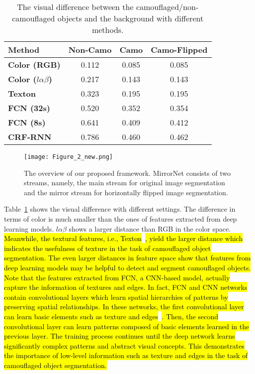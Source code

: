 \documentclass[journal]{IEEEtran}
\DeclareRobustCommand{\hlcyan}[1]{{\sethlcolor{white}\hl{#1}}}
\begin{document}
\begin{table}[!t]
	\small	
	\centering
	\begin{tabular}{|l|c|c|c|}
		\hline
		\textbf{Method} & \textbf{Non-Camo} & \textbf{Camo} & \textbf{Camo-Flipped }\\
		\hline
		\textbf{Color (RGB)} & 0.112 & 0.085 & 0.085  \\
		
		\hline
		\textbf{Color ($l\alpha\beta$)} & 0.217 & 0.143 & 0.143  \\
		
		\hline
		
		\textbf{Texton~\cite{texton} } & 0.323 & 0.195 & 0.195  \\
		
		\hline
		\textbf{FCN (32s)~\cite{Long-ICCV2015}} & 0.520 & 0.352 & 0.354  \\
		\hline
		\textbf{FCN (8s)~\cite{Long-ICCV2015}} & 0.641 & 0.409 & 0.412  \\
		\hline
		\textbf{CRF-RNN~\cite{CRF}} & 0.786 & 0.460 & 0.462  \\
		\hline
	\end{tabular}
	\caption{The visual difference between the camouflaged/non-camouflaged objects and the background with different methods. 
} 
	\label{table:motivation}
\end{table}

\begin{figure*}[t]
	\centering
	\texttt{[image: Figure\_2\_new.png]}
\caption{The overview of our proposed framework. MirrorNet consists of two streams, namely, the main stream for original image segmentation and the mirror stream for horizontally flipped image segmentation.}
	\label{fig:framework}
\end{figure*}


Table~\ref{table:motivation} shows the visual difference with different  settings. The difference in terms of color is much smaller than the ones of features extracted from deep learning models. $l\alpha\beta$ shows a larger distance than RGB in the color space. \hlcyan{Meanwhile, the textural features, i.e.,  Texton}~\cite{texton}\hlcyan{, yield the larger distance which indicates the usefulness of texture in the task of  camouflaged object segmentation. The even larger distances in feature space show that features from deep learning models may be helpful to detect and segment camouflaged objects. Note that the features extracted from FCN, a CNN-based model, actually capture the information of textures and edges. In fact, FCN and CNN networks contain convolutional layers which learn spatial hierarchies of patterns by preserving spatial relationships. In these networks, the first convolutional layer can learn basic elements such as texture and edges}~\cite{QuocLe}\hlcyan{. Then, the second convolutional layer can learn patterns composed of basic elements learned in the previous layer. The training process continues until the deep network learns  significantly complex patterns and abstract visual concepts. This demonstrates the importance of low-level information such as texture and edges in the task of camouflaged object segmentation.} 
\end{document}
